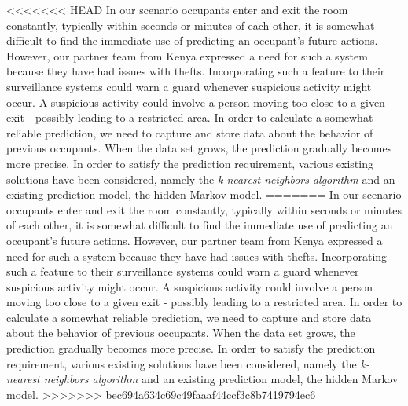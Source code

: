 <<<<<<< HEAD
In our scenario occupants enter and exit the room constantly, typically within seconds or minutes of each other, it is somewhat difficult to find the immediate use of predicting an occupant's future actions. However, our partner team from Kenya expressed a need for such a system because they have had issues with thefts. Incorporating such a feature to their surveillance systems could warn a guard whenever suspicious activity might occur. A suspicious activity could involve a person moving too close to a given exit - possibly leading to a restricted area. In order to calculate a somewhat reliable prediction, we need to capture and store data about the behavior of previous occupants. When the data set grows, the prediction gradually becomes more precise. In order to satisfy the prediction requirement, various existing solutions have been considered, namely the \emph{k-nearest neighbors algorithm} and an existing prediction model, the hidden Markov model.
=======
In our scenario occupants enter and exit the room constantly, typically within seconds or minutes of each other, it is somewhat difficult to find the immediate use of predicting an occupant's future actions. However, our partner team from Kenya expressed a need for such a system because they have had issues with thefts. Incorporating such a feature to their surveillance systems could warn a guard whenever suspicious activity might occur. A suspicious activity could involve a person moving too close to a given exit - possibly leading to a restricted area. In order to calculate a somewhat reliable prediction, we need to capture and store data about the behavior of previous occupants. When the data set grows, the prediction gradually becomes more precise. In order to satisfy the prediction requirement, various existing solutions have been considered, namely the \emph{k-nearest neighbors algorithm} and an existing prediction model, the hidden Markov model. 
>>>>>>> bec694a634c69c49faaaf44ccf3c8b7419794ec6

